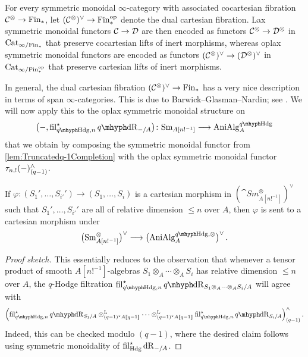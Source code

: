 \documentclass[DIV=12,numbers=enddot,leqno,bibliography=totoc]{scrartcl}
\begin{document}
	\begin{numpar}
		For every symmetric monoidal $\infty$-category with associated cocartesian fibration $\mathcal{C}^\otimes\rightarrow \mathrm{Fin}_*$, let $(\mathcal{C}^\otimes)^\vee\rightarrow\mathrm{Fin}_*^{\mathrm{op}}$ denote the dual cartesian fibration. Lax symmetric monoidal functors $\mathcal{C}\rightarrow \mathcal{D}$ are then encoded as functors $\mathcal{C}^\otimes\rightarrow \mathcal{D}^\otimes$ in $\mathrm{Cat}_{\infty/\mathrm{Fin}_*}$ that preserve cocartesian lifts of inert morphisms, whereas oplax symmetric monoidal functors are encoded as functors $(\mathcal{C}^\otimes)^\vee\rightarrow (\mathcal{D}^\otimes)^\vee$ in $\mathrm{Cat}_{\infty/\mathrm{Fin}_*^{\mathrm{op}}}$ that preserve cartesian lifts of inert morphisms.
		
		In general, the dual cartesian fibration $(\mathcal{C}^\otimes)^\vee\rightarrow \mathrm{Fin}_*$ has a very nice description in terms of span $\infty$-categories. This is due to Barwick--Glasman--Nardin; see \cite[]{DualFibration}. We will now apply this to the oplax symmetric monoidal structure on
		\begin{equation*}
			\bigl(-,\fil_{\qHodge,n}^\star\qdeRham_{-/A}\bigr)\colon \cat{Sm}_{A[n!^{-1}]}\longrightarrow \cat{AniAlg}_A^{\qHodge}
		\end{equation*}
		that we obtain by composing the symmetric monoidal functor from \cref{lem:Truncatedq-1Completion} with the oplax symmetric monoidal functor $\tau_{n,!}(-)_{(q-1)}^\wedge$.
	\end{numpar}
	\begin{lem}\label{lem:CartesianLiftsPreserved}
		If $\varphi\colon (S_1',\dotsc,S_{i'}')\rightarrow (S_1,\dotsc,S_i)$ is a cartesian morphism in $(\cat{Sm}_{A[n!^{-1}]}^{\otimes})^\vee$ such that $S_1',\dotsc,S_{i'}'$ are all of relative dimension $\leqslant n$ over $A$, then $\varphi$ is sent to a cartesian morphism under
		\begin{equation*}
			\bigl(\cat{Sm}_{A[n!^{-1}]}^{\otimes}\bigr)^\vee\longrightarrow \bigl(\cat{AniAlg}_A^{\qHodge,\otimes}\bigr)^\vee\,.
		\end{equation*}
	\end{lem}
	\begin{proof}[Proof sketch]
		This essentially reduces to the observation that whenever a tensor product of smooth $A[n!^{-1}]$-algebras $S_1\otimes_A\dotsb\otimes_A S_i$ has relative dimension $\leqslant n$ over $A$, the $q$-Hodge filtration $\fil_{\qHodge,n}^\star \qdeRham_{S_1\otimes_A\dotsb \otimes_AS_i/A}$ will agree with
		\begin{equation*}
			\left(\fil_{\qHodge,n}^\star \qdeRham_{S_1/A}\lotimes_{(q-1)^\star A\qpower}\dotsb \lotimes_{(q-1)^\star A\qpower}\fil_{\qHodge,n}^\star \qdeRham_{S_i/A}\right)_{(q-1)}^\complete\,.
		\end{equation*}
		Indeed, this can be checked modulo $(q-1)$, where the desired claim follows using symmetric monoidality of $\operatorname{fil}_{\mathrm{Hdg}}^\star\mathrm{dR}_{-/A}$.
	\end{proof}
	
\end{document}

